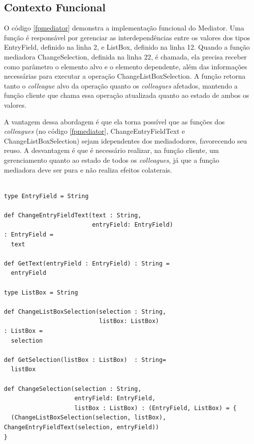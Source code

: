 \subsection*{Contexto Funcional}

O código \ref{fpmediator} demonstra a implementação 
funcional do Mediator. Uma função é responsável por 
gerenciar as interdependências entre os valores 
dos tipos EntryField, definido na linha 2, e ListBox, 
definido na linha 12. Quando a função mediadora ChangeSelection, 
definida na linha 22, é chamada, ela precisa receber 
como parâmetro o elemento alvo e o elemento dependente, 
além das informações necessárias para executar a 
operação ChangeListBoxSelection. A função retorna 
tanto o \textit{colleague} alvo da operação 
quanto os \textit{colleagues} afetados, mantendo 
a função cliente que chama essa operação atualizada 
quanto ao estado de ambos os valores. 

A vantagem dessa abordagem é que ela torna possível 
que as funções dos \textit{colleagues} (no código 
\ref{fpmediator}, ChangeEntryFieldText e 
ChangeListBoxSelection) sejam idependentes dos 
mediadodores, favorecendo seu reuso. A desvantagem 
é que é necessário realizar, na função cliente, 
um gerenciamento quanto ao estado de todos os 
\textit{colleagues}, já que a função mediadora 
deve ser pura e não realiza efeitos colaterais.

\begin{lstlisting}[caption={Mediator Funcional},label=fpmediator]
    
type EntryField = String

def ChangeEntryFieldText(text : String,
						 entryField: EntryField)
: EntryField =
  text
  
def GetText(entryField : EntryField) : String =
  entryField
  
type ListBox = String
  
def ChangeListBoxSelection(selection : String,
						   listBox: ListBox)
: ListBox =
  selection
  
def GetSelection(listBox : ListBox)  : String=
  listBox
  
def ChangeSelection(selection : String,
					entryField: EntryField,
					listBox : ListBox) : (EntryField, ListBox) = {
  (ChangeListBoxSelection(selection, listBox), ChangeEntryFieldText(selection, entryField))
}
	    
\end{lstlisting}